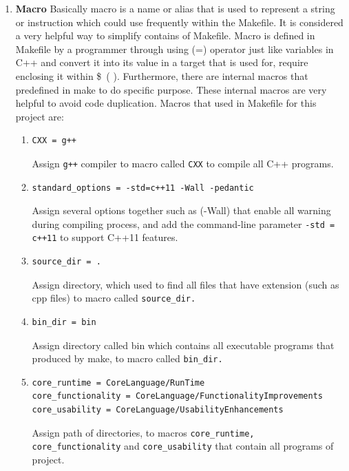 \documentclass[11pt]{report}
\begin{document}
\begin{enumerate}
\item \textbf{Macro} Basically macro is a name or alias that is used to represent a string or instruction which could use frequently within the Makefile. It is considered a very helpful way to simplify contains of Makefile. Macro is defined in Makefile by a programmer through using (=) operator just like variables in C++ and convert it into its value in a target that is used for, require enclosing it within \$~( ). Furthermore, there are internal macros that predefined in make to do specific purpose. These internal macros are very helpful to avoid code duplication. Macros that used in Makefile for this project are:

\begin{enumerate}

\item \begin{verbatim}
CXX = g++ 
\end{verbatim}
Assign \texttt{g++} compiler to macro called \texttt{CXX} to compile all C++ programs.


\item \begin{verbatim}
standard_options = -std=c++11 -Wall -pedantic
\end{verbatim}
Assign several options together such as (-Wall) that enable all warning during compiling process, and add the command-line parameter \texttt{-std = c++11} to support C++11 features.

\item \begin{verbatim}
source_dir = .
\end{verbatim}
Assign directory, which used to find all files that have extension (such as cpp files) to macro called \texttt{source\_dir.}

\item \begin{verbatim}
bin_dir = bin
\end{verbatim}
Assign directory called bin which contains all executable programs that produced by make, to macro called \texttt{bin\_dir.}

\item \begin{verbatim}
core_runtime = CoreLanguage/RunTime
core_functionality = CoreLanguage/FunctionalityImprovements
core_usability = CoreLanguage/UsabilityEnhancements
\end{verbatim}
Assign path of directories, to macros \texttt{core\_runtime, core\_functionality} and \texttt{core\_usability} that contain all programs of project.


\end{enumerate}
\end{enumerate}
\end{document}
